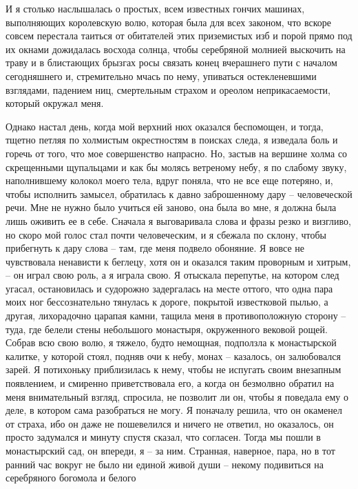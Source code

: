 И  я  столько   наслышалась  о  простых,  всем   известных  гончих  машинах,
выполняющих  королевскую волю,  которая была  для всех  законом, что  вскоре
совсем перестала  таиться от обитателей  этих приземистых изб и  порой прямо
под их окнами дожидалась восхода  солнца, чтобы серебряной молнией выскочить
на  траву и  в  блистающих  брызгах росы  связать  конец  вчерашнего пути  с
началом сегодняшнего и, стремительно мчась по нему, упиваться остекленевшими
взглядами,  падением ниц,  смертельным  страхом  и ореолом  неприкасаемости,
который окружал меня.

Однако настал день, когда мой верхний нюх оказался беспомощен, и тогда,
тщетно  петляя  по холмистым окрестностям в поисках следа, я изведала боль и
горечь от того, что мое совершенство напрасно. Но, застыв на  вершине  холма
со  скрещенными  щупальцами  и  как  бы  молясь ветреному небу, я по слабому
звуку, наполнившему колокол  моего  тела,  вдруг  поняла,  что  не  все  еще
потеряно,  и,  чтобы исполнить замысел, обратилась к давно заброшенному дару
-- человеческой речи. Мне не нужно было учиться ей заново, она была во  мне,
я  должна  была лишь оживить ее в себе. Сначала я выговаривала слова и фразы
резко и визгливо, но скоро мой голос стал почти человеческим, и я сбежала по
склону, чтобы прибегнуть к дару слова -- там, где меня подвело  обоняние.  Я
вовсе не чувствовала ненависти к беглецу, хотя он и оказался таким проворным
и  хитрым,  -- он играл свою роль, а я играла свою. Я отыскала перепутье, на
котором след угасал, остановилась и судорожно задергалась на  месте  оттого,
что   одна   пара  моих  ног  бессознательно  тянулась  к  дороге,  покрытой
известковой пылью, а  другая,  лихорадочно  царапая  камни,  тащила  меня  в
противоположную  сторону  --  туда,  где  белели стены небольшого монастыря,
окруженного вековой рощей. Собрав всю свою волю, я тяжело,  будто  немощная,
подползла  к монастырской калитке, у которой стоял, подняв очи к небу, монах
-- казалось, он залюбовался зарей. Я потихоньку приблизилась к  нему,  чтобы
не  испугать  своим  внезапным  появлением, и смиренно приветствовала его, а
когда он  безмолвно  обратил  на  меня  внимательный  взгляд,  спросила,  не
позволит  ли  он, чтобы я поведала ему о деле, в котором сама разобраться не
могу. Я поначалу  решила,  что  он  окаменел  от  страха,  ибо  он  даже  не
пошевелился  и ничего не ответил, но оказалось, он просто задумался и минуту
спустя сказал, что согласен. Тогда мы пошли в монастырский сад, он  впереди,
я -- за ним. Странная, наверное, пара, но в тот ранний час вокруг не было ни
единой  живой  души  --  некому  подивиться на серебряного богомола и белого
